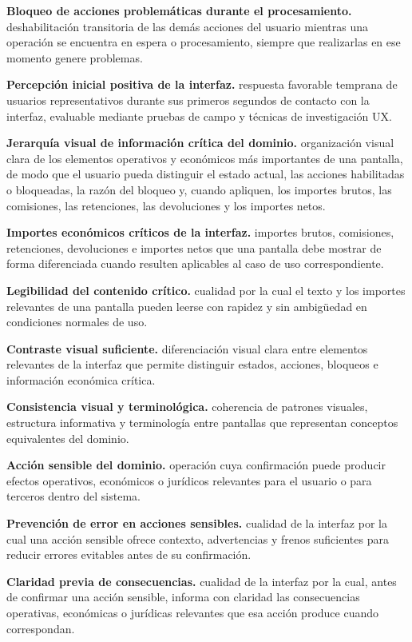 \documentclass[10pt,letterpaper]{article}
\begin{document}
\noindent\textbf{Bloqueo de acciones problemáticas durante el procesamiento.} deshabilitación transitoria de las demás acciones del usuario mientras una operación se encuentra en espera o procesamiento, siempre que realizarlas en ese momento genere problemas.\par
\noindent\textbf{Percepción inicial positiva de la interfaz.} respuesta favorable temprana de usuarios representativos durante sus primeros segundos de contacto con la interfaz, evaluable mediante pruebas de campo y técnicas de investigación UX.\par
\noindent\textbf{Jerarquía visual de información crítica del dominio.} organización visual clara de los elementos operativos y económicos más importantes de una pantalla, de modo que el usuario pueda distinguir el estado actual, las acciones habilitadas o bloqueadas, la razón del bloqueo y, cuando apliquen, los importes brutos, las comisiones, las retenciones, las devoluciones y los importes netos.\par
\noindent\textbf{Importes económicos críticos de la interfaz.} importes brutos, comisiones, retenciones, devoluciones e importes netos que una pantalla debe mostrar de forma diferenciada cuando resulten aplicables al caso de uso correspondiente.\par
\noindent\textbf{Legibilidad del contenido crítico.} cualidad por la cual el texto y los importes relevantes de una pantalla pueden leerse con rapidez y sin ambigüedad en condiciones normales de uso.\par
\noindent\textbf{Contraste visual suficiente.} diferenciación visual clara entre elementos relevantes de la interfaz que permite distinguir estados, acciones, bloqueos e información económica crítica.\par
\noindent\textbf{Consistencia visual y terminológica.} coherencia de patrones visuales, estructura informativa y terminología entre pantallas que representan conceptos equivalentes del dominio.\par
\noindent\textbf{Acción sensible del dominio.} operación cuya confirmación puede producir efectos operativos, económicos o jurídicos relevantes para el usuario o para terceros dentro del sistema.\par
\noindent\textbf{Prevención de error en acciones sensibles.} cualidad de la interfaz por la cual una acción sensible ofrece contexto, advertencias y frenos suficientes para reducir errores evitables antes de su confirmación.\par
\noindent\textbf{Claridad previa de consecuencias.} cualidad de la interfaz por la cual, antes de confirmar una acción sensible, informa con claridad las consecuencias operativas, económicas o jurídicas relevantes que esa acción produce cuando correspondan.\par
\end{document}
